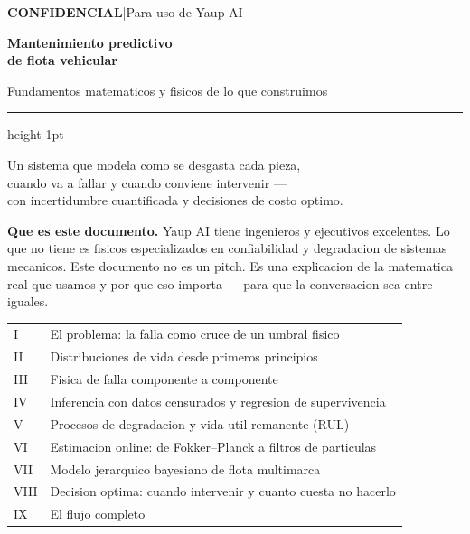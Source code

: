 \documentclass[10.5pt,a4paper]{article}
\begin{document}
\thispagestyle{empty}
\vspace*{1.2cm}

{\color{muted}\small\textbf{CONFIDENCIAL}\quad|\quad Para uso de Yaup AI}

\vspace{0.9cm}

{\fontsize{28}{33}\selectfont\bfseries\color{primary}
Mantenimiento predictivo\\ de flota vehicular}

\vspace{0.4cm}

{\fontsize{14}{18}\selectfont\color{accent}
Fundamentos matematicos y fisicos de lo que construimos}

\vspace{0.5cm}
{\color{bordercol}\hrule height 1pt}
\vspace{0.5cm}

{\large\color{muted}
Un sistema que modela como se desgasta cada pieza,\\
cuando va a fallar y cuando conviene intervenir ---\\
con incertidumbre cuantificada y decisiones de costo optimo.
}

\vspace{1.2cm}

\begin{notebox}
\textbf{Que es este documento.}
Yaup AI tiene ingenieros y ejecutivos excelentes.
Lo que no tiene es fisicos especializados en confiabilidad y degradacion de sistemas mecanicos.
Este documento no es un pitch.
Es una explicacion de la matematica real que usamos y por que eso importa ---
para que la conversacion sea entre iguales.
\end{notebox}

\vspace{1.0cm}

\begin{tabular}{@{}p{0.5cm}p{13cm}@{}}
  \color{accent}I   & El problema: la falla como cruce de un umbral fisico \\[4pt]
  \color{accent}II  & Distribuciones de vida desde primeros principios \\[4pt]
  \color{accent}III & Fisica de falla componente a componente \\[4pt]
  \color{accent}IV  & Inferencia con datos censurados y regresion de supervivencia \\[4pt]
  \color{accent}V   & Procesos de degradacion y vida util remanente (RUL) \\[4pt]
  \color{accent}VI  & Estimacion online: de Fokker--Planck a filtros de particulas \\[4pt]
  \color{accent}VII & Modelo jerarquico bayesiano de flota multimarca \\[4pt]
  \color{accent}VIII& Decision optima: cuando intervenir y cuanto cuesta no hacerlo \\[4pt]
  \color{accent}IX  & El flujo completo \\
\end{tabular}
\end{document}
